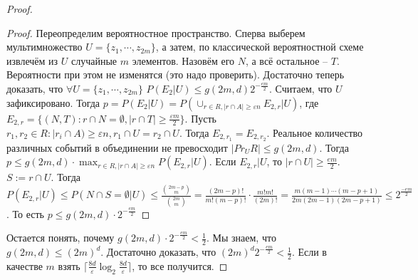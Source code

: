 \documentclass[document.tex]{subfiles}
\begin{document}
\begin{proof}
\begin{proof}
    Переопределим вероятностное пространство. Сперва выберем мультимножество $U = \{z_1, \cdots, z_{2m}\}$, а затем, по
    классической вероятностной схеме извлечём из $U$ случайные $m$ элементов. Назовём его $N$, а всё остальное -- $T$.
    Вероятности при этом не изменятся (это надо проверить). Достаточно теперь доказать, что $\forall U = \{z_1, \cdots,
    z_{2m} \}$ $P(E_2 | U) \leq g(2m, d) 2^{-\frac{em}{2}}$. Считаем, что $U$ зафиксировано. Тогда
    $p = P(E_2|U) = P(\cup_{r \in R, |r \cap A| \geq \varepsilon n} E_{2, r} | U)$, где $E_{2, r} = \{(N, T): r \cap N =
        \emptyset, |r \cap T| \geq \frac{\varepsilon m}{2} \}$. Пусть $r_1, r_2 \in R: |r_i \cap A) \geq \varepsilon n,
        r_1 \cap U = r_2 \cap U$. Тогда $E_{2, r_1} = E_{2, r_2}$. Реальное количество различных событий в объединении
        не превосходит $|Pr_U R| \leq g(2m, d)$. Тогда $p \leq g(2m, d) \cdot \max_{r \in R, |r \cap A| \geq \varepsilon
        n} P(E_{2, r}| U)$. Если $E_{2, r}|U$, то $|r \cap U| \geq \frac{em}{2}$. $S := r \cap U$. Тогда $P(E_{2, r}|U)
        \leq P(N \cap S = \emptyset|U) \leq \frac{\binom{2m - p}{m}}{\binom{2m}{m}} = \frac{(2m - p)!}{m! (m - p)!}
        \cdot \frac{m! m!}{(2m)!} = \frac{m (m - 1) \cdots (m - p + 1)}{2m (2m - 1) (2m - p + 1)} \leq
        2^{\frac{-em}{2}}$. То есть $p \leq g(2m, d) \cdot 2^{-\frac{em}{2}}$
\end{proof}

Остается понять, почему $g(2m, d) \cdot 2^{-\frac{em}{2}} < \frac{1}{2}$. Мы знаем, что $g(2m, d) \leq (2m)^{d}$.
Достаточно доказать, что $(2m)^{d} 2^{-\frac{em}{2}} < \frac{1}{2}$. Если в качестве $m$ взять $\lceil
\frac{8d}{\varepsilon} \log_2 \frac{8d}{\varepsilon} \rceil$, то все получится.
\end{proof}
\end{document}

